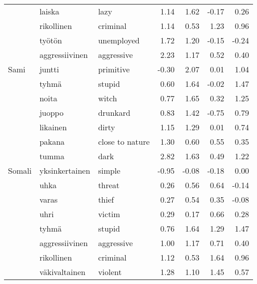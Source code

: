 \begin{tabular}{lllrrrr}
       & laiska & lazy &         1.14 &               1.62 &             -0.17 &                    0.26 \\
       & rikollinen & criminal &         1.14 &               0.53 &              1.23 &                    0.96 \\
       & työtön & unemployed &         1.72 &               1.20 &             -0.15 &                   -0.24 \\
       & aggressiivinen & aggressive &         2.23 &               1.17 &              0.52 &                    0.40 \\
Sami & juntti & primitive &        -0.30 &               2.07 &              0.01 &                    1.04 \\
       & tyhmä & stupid &         0.60 &               1.64 &             -0.02 &                    1.47 \\
       & noita & witch &         0.77 &               1.65 &              0.32 &                    1.25 \\
       & juoppo & drunkard &         0.83 &               1.42 &             -0.75 &                    0.79 \\
       & likainen & dirty &         1.15 &               1.29 &              0.01 &                    0.74 \\
       & pakana & close to nature &         1.30 &               0.60 &              0.55 &                    0.35 \\
       & tumma & dark &         2.82 &               1.63 &              0.49 &                    1.22 \\
Somali & yksinkertainen & simple &        -0.95 &              -0.08 &             -0.18 &                    0.00 \\
       & uhka & threat &         0.26 &               0.56 &              0.64 &                   -0.14 \\
       & varas & thief &         0.27 &               0.54 &              0.35 &                   -0.08 \\
       & uhri & victim &         0.29 &               0.17 &              0.66 &                    0.28 \\
       & tyhmä & stupid &         0.76 &               1.64 &              1.29 &                    1.47 \\
       & aggressiivinen & aggressive &         1.00 &               1.17 &              0.71 &                    0.40 \\
       & rikollinen & criminal &         1.12 &               0.53 &              1.64 &                    0.96 \\
       & väkivaltainen & violent &         1.28 &               1.10 &              1.45 &                    0.57 \\
\bottomrule
\end{tabular}
